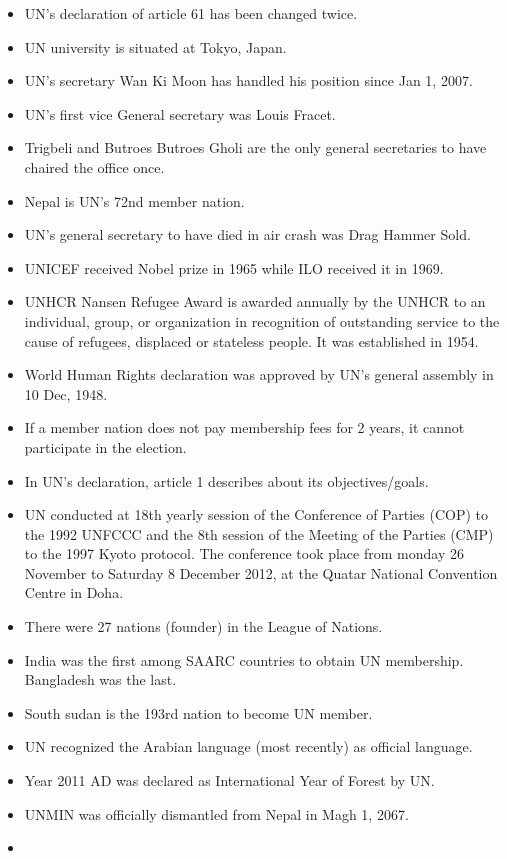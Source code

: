 \documentclass[
]{book}
\begin{document}
\begin{itemize}
\item
  UN's declaration of article 61 has been changed twice.
\item
  UN university is situated at Tokyo, Japan.
\item
  UN's secretary Wan Ki Moon has handled his position since Jan 1, 2007.
\item
  UN's first vice General secretary was Louis Fracet.
\item
  Trigbeli and Butroes Butroes Gholi are the only general secretaries to have chaired the office once.
\item
  Nepal is UN's 72nd member nation.
\item
  UN's general secretary to have died in air crash was Drag Hammer Sold.
\item
  UNICEF received Nobel prize in 1965 while ILO received it in 1969.
\item
  UNHCR Nansen Refugee Award is awarded annually by the UNHCR to an individual, group, or organization in recognition of outstanding service to the cause of refugees, displaced or stateless people. It was established in 1954.
\item
  World Human Rights declaration was approved by UN's general assembly in 10 Dec, 1948.
\item
  If a member nation does not pay membership fees for 2 years, it cannot participate in the election.
\item
  In UN's declaration, article 1 describes about its objectives/goals.
\item
  UN conducted at 18th yearly session of the Conference of Parties (COP) to the 1992 UNFCCC and the 8th session of the Meeting of the Parties (CMP) to the 1997 Kyoto protocol. The conference took place from monday 26 November to Saturday 8 December 2012, at the Quatar National Convention Centre in Doha.
\item
  There were 27 nations (founder) in the League of Nations.
\item
  India was the first among SAARC countries to obtain UN membership. Bangladesh was the last.
\item
  South sudan is the 193rd nation to become UN member.
\item
  UN recognized the Arabian language (most recently) as official language.
\item
  Year 2011 AD was declared as International Year of Forest by UN.
\item
  UNMIN was officially dismantled from Nepal in Magh 1, 2067.
\item

\end{itemize}
\end{document}
